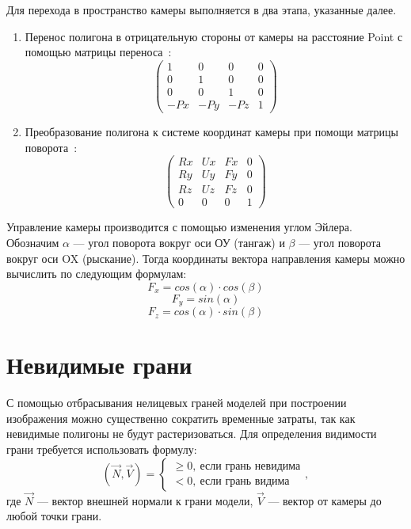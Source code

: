 Для перехода в пространство камеры выполняется в два этапа, указанные далее.
\begin{enumerate}
	\item Перенос полигона в отрицательную стороны от камеры на расстояние Point с помощью матрицы переноса~\cite{palcing-camera}:
	\begin{equation}
		\begin{pmatrix}
			1  & 0  & 0  & 0 \\
			0  & 1  & 0  & 0 \\
			0  & 0  & 1  & 0 \\
			-Px & -Py & -Pz & 1
		\end{pmatrix}
	\end{equation}
	\item Преобразование полигона к системе координат камеры при помощи матрицы поворота~\cite{palcing-camera}:
	\begin{equation}
		\begin{pmatrix}
			Rx  & Ux  & Fx  & 0 \\
			Ry  & Uy  & Fy  & 0 \\
			Rz  & Uz  & Fz  & 0 \\
			0   & 0   & 0   & 1
		\end{pmatrix}
	\end{equation}
\end{enumerate}

Управление камеры производится с помощью изменения углом Эйлера.
Обозначим $\alpha$ --- угол поворота вокруг оси ОУ (тангаж) и  $\beta$ --- угол поворота вокруг оси OX (рыскание).
Тогда координаты вектора направления камеры можно вычислить по следующим формулам:
\begin{equation}
	F_x = cos(\alpha) \cdot cos(\beta)
\end{equation}
\begin{equation}
	F_y = sin(\alpha)
\end{equation}
\begin{equation}
	F_z = cos(\alpha) \cdot sin(\beta)
\end{equation}

\section{Невидимые грани}
С помощью отбрасывания нелицевых граней моделей при построении изображения можно существенно сократить временные затраты, так как невидимые полигоны не будут растеризоваться.
Для определения видимости грани требуется использовать формулу:
\begin{equation}
	(\overrightarrow{N}, \overrightarrow{V}) = \begin{cases}
		 \geq 0,~\text{если грань невидима} \\
		 < 0,~\text{если грань видима}
	\end{cases},
\end{equation}
где $\overrightarrow{N}$ --- вектор внешней нормали к грани модели, $\overrightarrow{V}$ --- вектор от камеры до любой точки грани.

